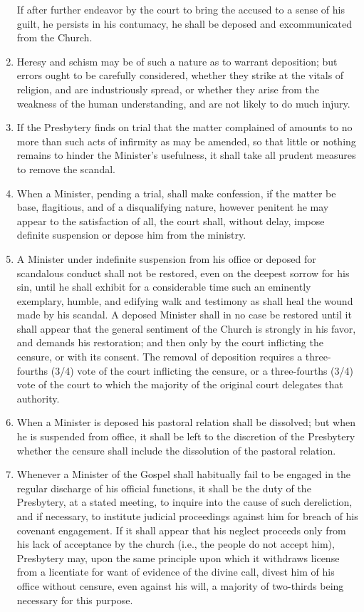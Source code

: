 \documentclass[
]{book}
\begin{document}
\begin{enumerate}
  If after further endeavor by the court to bring the accused to a sense of his guilt, he persists in his contumacy, he shall be deposed and excommunicated from the Church.
\item
  Heresy and schism may be of such a nature as to warrant deposition; but errors ought to be carefully considered, whether they strike at the vitals of religion, and are industriously spread, or whether they arise from the weakness of the human understanding, and are not likely to do much injury.
\item
  If the Presbytery finds on trial that the matter complained of amounts to no more than such acts of infirmity as may be amended, so that little or nothing remains to hinder the Minister's usefulness, it shall take all prudent measures to remove the scandal.
\item
  When a Minister, pending a trial, shall make confession, if the matter be base, flagitious, and of a disqualifying nature, however penitent he may appear to the satisfaction of all, the court shall, without delay, impose definite suspension or depose him from the ministry.
\item
  \protect\hypertarget{38.8}{\href{}{}}A Minister under indefinite suspension from his office or deposed for scandalous conduct shall not be restored, even on the deepest sorrow for his sin, until he shall exhibit for a considerable time such an eminently exemplary, humble, and edifying walk and testimony as shall heal the wound made by his scandal. A deposed Minister shall in no case be restored until it shall appear that the general sentiment of the Church is strongly in his favor, and demands his restoration; and then only by the court inflicting the censure, or with its consent. The removal of deposition requires a three-fourths (3/4) vote of the court inflicting the censure, or a three-fourths (3/4) vote of the court to which the majority of the original court delegates that authority.
\item
  When a Minister is deposed his pastoral relation shall be dissolved; but when he is suspended from office, it shall be left to the discretion of the Presbytery whether the censure shall include the dissolution of the pastoral relation.
\item
  \protect\hypertarget{38.10}{\href{}{}}Whenever a Minister of the Gospel shall habitually fail to be engaged in the regular discharge of his official functions, it shall be the duty of the Presbytery, at a stated meeting, to inquire into the cause of such dereliction, and if necessary, to institute judicial proceedings against him for breach of his covenant engagement. If it shall appear that his neglect proceeds only from his lack of acceptance by the church (i.e., the people do not accept him), Presbytery may, upon the same principle upon which it withdraws license from a licentiate for want of evidence of the divine call, divest him of his office without censure, even against his will, a majority of two-thirds being necessary for this purpose.


\end{enumerate}
\end{document}
